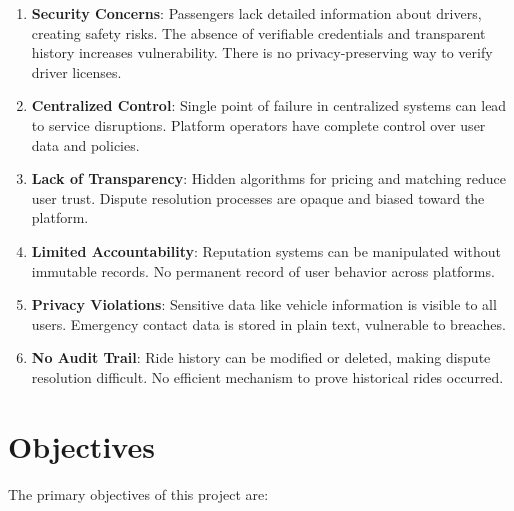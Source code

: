 \documentclass[12pt]{report}
\theoremstyle{plain}
\theoremstyle{definition}
\theoremstyle{remark}
\begin{document}
\begin{enumerate}
    \item \textbf{Security Concerns}: Passengers lack detailed information about drivers, creating safety risks. The absence of verifiable credentials and transparent history increases vulnerability. There is no privacy-preserving way to verify driver licenses.
    
    \item \textbf{Centralized Control}: Single point of failure in centralized systems can lead to service disruptions. Platform operators have complete control over user data and policies.
    
    \item \textbf{Lack of Transparency}: Hidden algorithms for pricing and matching reduce user trust. Dispute resolution processes are opaque and biased toward the platform.
    
    \item \textbf{Limited Accountability}: Reputation systems can be manipulated without immutable records. No permanent record of user behavior across platforms.
    
    \item \textbf{Privacy Violations}: Sensitive data like vehicle information is visible to all users. Emergency contact data is stored in plain text, vulnerable to breaches.
    
    \item \textbf{No Audit Trail}: Ride history can be modified or deleted, making dispute resolution difficult. No efficient mechanism to prove historical rides occurred.
\end{enumerate}

\section{Objectives}

The primary objectives of this project are:
\end{document}

